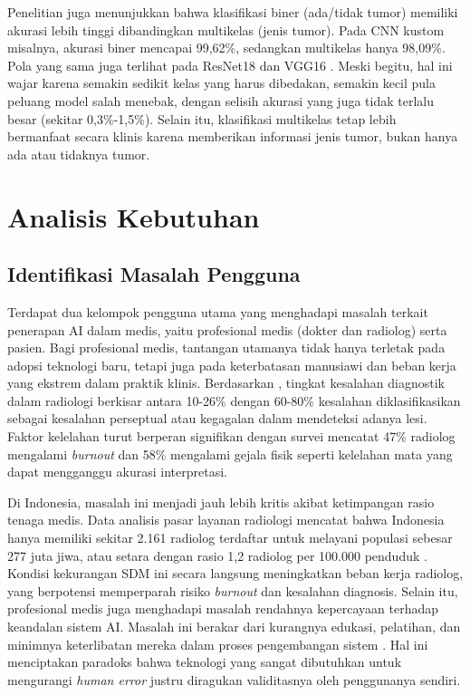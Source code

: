 Penelitian \textcite{khan2024comparative} juga menunjukkan bahwa klasifikasi biner (ada/tidak tumor) memiliki akurasi lebih tinggi dibandingkan multikelas (jenis tumor). Pada CNN kustom misalnya, akurasi biner mencapai 99,62\%, sedangkan multikelas hanya 98,09\%. Pola yang sama juga terlihat pada ResNet18 dan VGG16 \cite{khan2024comparative}. Meski begitu, hal ini wajar karena semakin sedikit kelas yang harus dibedakan, semakin kecil pula peluang model salah menebak, dengan selisih akurasi yang juga tidak terlalu besar (sekitar 0,3\%-1,5\%). Selain itu, klasifikasi multikelas tetap lebih bermanfaat secara klinis karena memberikan informasi jenis tumor, bukan hanya ada atau tidaknya tumor.

\section{Analisis Kebutuhan}
\subsection{Identifikasi Masalah Pengguna}
Terdapat dua kelompok pengguna utama yang menghadapi masalah terkait penerapan AI dalam medis, yaitu profesional medis (dokter dan radiolog) serta pasien.
Bagi profesional medis, tantangan utamanya tidak hanya terletak pada adopsi teknologi baru, tetapi juga pada keterbatasan manusiawi dan beban kerja yang ekstrem dalam praktik klinis. Berdasarkan \textcite{zhang2023diagnostic}, tingkat kesalahan diagnostik dalam radiologi berkisar antara 10-26\% dengan 60-80\% kesalahan  diklasifikasikan sebagai kesalahan perseptual atau kegagalan dalam mendeteksi adanya lesi. Faktor kelelahan turut berperan signifikan dengan survei mencatat 47\% radiolog mengalami \textit{burnout} dan 58\% mengalami gejala fisik seperti kelelahan mata yang dapat mengganggu akurasi interpretasi.

Di Indonesia, masalah ini menjadi jauh lebih kritis akibat ketimpangan rasio tenaga medis. Data analisis pasar layanan radiologi mencatat bahwa Indonesia hanya memiliki sekitar 2.161 radiolog terdaftar untuk melayani populasi sebesar 277 juta jiwa, atau setara dengan rasio 1,2 radiolog per 100.000 penduduk \autocite{insights102023indonesia}. Kondisi kekurangan SDM ini secara langsung meningkatkan beban kerja radiolog, yang berpotensi memperparah risiko \textit{burnout} dan kesalahan diagnosis. Selain itu,
profesional medis juga menghadapi masalah rendahnya kepercayaan terhadap keandalan sistem AI. Masalah ini berakar dari kurangnya edukasi, pelatihan, dan minimnya keterlibatan mereka dalam proses pengembangan sistem \autocite{syaftahan2025transformasi}. Hal ini menciptakan paradoks bahwa teknologi yang sangat dibutuhkan untuk mengurangi \textit{human error} justru diragukan validitasnya oleh penggunanya sendiri.

